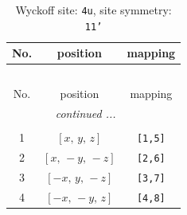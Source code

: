 \documentclass[fleqn,8pt]{jsarticle}
\begin{document}
\begin{longtable}{ccc}
\caption{Wyckoff site: {\tt 4u}, site symmetry: {\tt 11'}}
 \\
 \hline \hline
No. & position & mapping \\ \hline \endfirsthead

\multicolumn{2}{l}{\tablename\ \thetable{}} \\
 \hline \hline
No. & position & mapping \\ \hline \endhead

 \hline \hline
\multicolumn{2}{r}{\footnotesize\it continued ...} \\ \endfoot

 \hline \hline
\multicolumn{2}{r}{} \\ \endlastfoot

1 & $\left[ x,\, y,\, z \right]$ & {\tt [1,5]} \\ \hline
2 & $\left[ x,\, - y,\, - z \right]$ & {\tt [2,6]} \\ \hline
3 & $\left[ - x,\, y,\, - z \right]$ & {\tt [3,7]} \\ \hline
4 & $\left[ - x,\, - y,\, z \right]$ & {\tt [4,8]} \\
\end{longtable}
\end{document}
